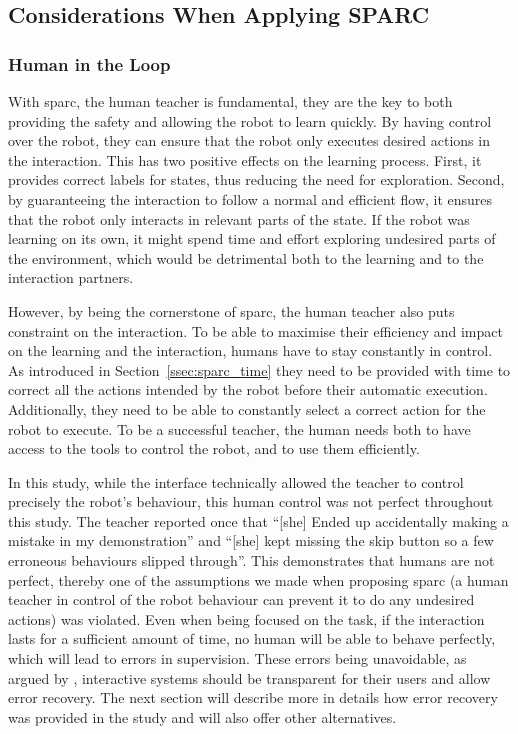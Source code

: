 \subsection{Considerations When Applying SPARC}

\subsubsection{Human in the Loop}\label{sec:tuto_loop}

With \gls{sparc}, the human teacher is fundamental, they are the key to both providing the safety and allowing the robot to learn quickly. By having control over the robot, they can ensure that the robot only executes desired actions in the interaction. This has two positive effects on the learning process. First, it provides correct labels for states, thus reducing the need for exploration. Second, by guaranteeing the interaction to follow a normal and efficient flow, it ensures that the robot only interacts in relevant parts of the state. If the robot was learning on its own, it might spend time and effort exploring undesired parts of the environment, which would be detrimental both to the learning and to the interaction partners.

However, by being the cornerstone of \gls{sparc}, the human teacher also puts constraint on the interaction. To be able to maximise their efficiency and impact on the learning and the interaction, humans have to stay constantly in control. As introduced in Section~\ref{ssec:sparc_time} they need to be provided with time to correct all the actions intended by the robot before their automatic execution. Additionally, they need to be able to constantly select a correct action for the robot to execute. To be a successful teacher, the human needs both to have access to the tools to control the robot, and to use them efficiently.

In this study, while the interface technically allowed the teacher to control precisely the robot's behaviour, this human control was not perfect throughout this study. 
The teacher reported once that ``[she] Ended up accidentally making a mistake in my demonstration'' and ``[she] kept missing the skip button so a few erroneous behaviours slipped through''. This demonstrates that humans are not perfect, thereby one of the assumptions we made when proposing \gls{sparc} (a human teacher in control of the robot behaviour can prevent it to do any undesired actions) was violated. Even when being focused on the task, if the interaction lasts for a sufficient amount of time, no human will be able to behave perfectly, which will lead to errors in supervision. These errors being unavoidable, as argued by \cite{rasmussen1989coping}, interactive systems should be transparent for their users and allow error recovery. The next section will describe more in details how error recovery was provided in the study and will also offer other alternatives.

